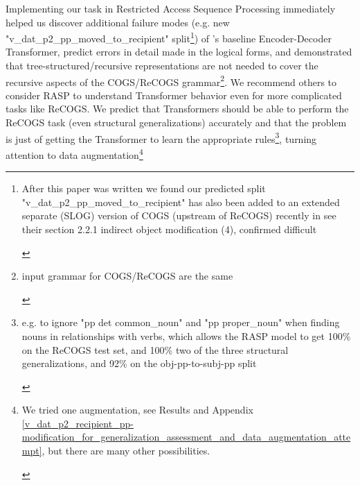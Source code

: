 \documentclass[11pt]{article}
\begin{document}
Implementing our task in Restricted Access Sequence Processing immediately helped us discover additional failure modes (e.g. new "v\_dat\_p2\_pp\_moved\_to\_recipient" split\footnote{\begin{footnotesize}After this paper was written we found our predicted split "v\_dat\_p2\_pp\_moved\_to\_recipient" has also been added to an extended separate (SLOG) version of COGS (upstream of ReCOGS) recently in \cite{li2023slogstructuralgeneralizationbenchmark} see their section 2.2.1 indirect object modification (4), confirmed difficult
\end{footnotesize}
}) of \cite{Wu2023}'s baseline Encoder-Decoder Transformer, predict errors in detail made in the logical forms, and demonstrated that tree-structured/recursive representations are not needed to cover the recursive aspects of the COGS/ReCOGS grammar\footnote{\begin{footnotesize}input grammar for COGS/ReCOGS are the same\end{footnotesize}}. We recommend others to consider RASP to understand Transformer behavior even for more complicated tasks like ReCOGS. We predict that Transformers should be able to perform the ReCOGS task (even structural generalizations) accurately and that the problem is just of getting the Transformer to learn the appropriate rules\footnote{\begin{footnotesize}e.g. to ignore "pp det common\_noun" and "pp proper\_noun" when finding nouns in relationships with verbs, which allows the RASP model to get 100\% on the ReCOGS test set, and 100\% two of the three structural generalizations, and 92\% on the obj-pp-to-subj-pp split\end{footnotesize}}, turning attention to data augmentation\footnote{\begin{footnotesize}We tried one augmentation, see Results and Appendix \ref{v_dat_p2_recipient_pp-modification_for_generalization_assessment_and_data_augmentation_attempt}, but there are many other possibilities.

\end{footnotesize}}
\end{document}
